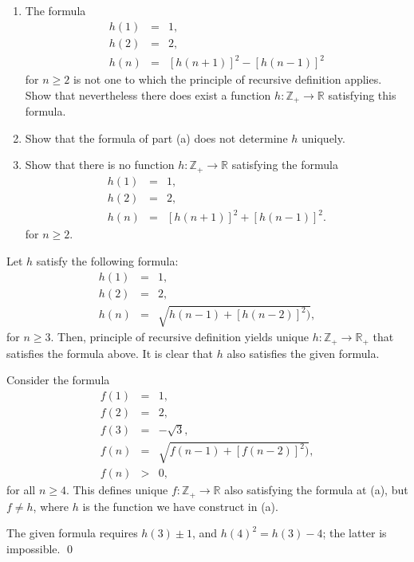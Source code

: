 \documentclass[a4paper,12pt]{article}
\begin{document}
\begin{exe}\leavevmode \par
	\begin{enumerate}
		\item
		      The formula
		      \begin{eqnarray*}
			      h(1)&=&1,\\
			      h(2)&=&2,\\
			      h(n)&=&\left[ h(n+1) \right]^2 - \left[ h(n-1) \right]^2
		      \end{eqnarray*}
		      for \( n\ge 2 \)
		      is not one to which the principle of recursive definition applies.
		      Show that nevertheless there does exist a function
		      \( h:\mathbb{Z}_{+}\to \mathbb{R}\)
		      satisfying this formula.
		      
		\item
		      Show that the formula of part (a) does not determine \( h \)
		      uniquely.
		      
		\item
		      Show that there is no function \( h:\mathbb{Z}_{+} \to \mathbb{R} \)
		      satisfying the formula
		      \begin{eqnarray*}
			      h(1)&=&1,\\
			      h(2)&=&2,\\
			      h(n)&=&\left[ h(n+1) \right]^2 + \left[ h(n-1) \right]^2.
		      \end{eqnarray*}
		      for \( n\ge 2 \).
	\end{enumerate}
\end{exe}\begin{sol}\leavevmode \par
	Let \( h \) satisfy the following formula:
	\begin{eqnarray*}
		h(1)&=&1,\\
		h(2)&=&2,\\
		h(n)&=&\sqrt{h(n-1)+\left[ h(n-2) \right]^2)},
	\end{eqnarray*}
	for \( n \ge 3 \).
	Then, principle of recursive definition yields unique
	\( h: \mathbb{Z}_{+} \to \mathbb{R}_{+}\)
	that satisfies the formula above.
	It is clear that \( h \) also satisfies the given formula.
	
	Consider the formula
	\begin{eqnarray*}
		f(1)&=&1,\\
		f(2)&=&2,\\
		f(3)&=&-\sqrt{3},\\
		f(n)&=&\sqrt{f(n-1)+\left[ f(n-2) \right]^2)},\\
		f(n)&>&0,
	\end{eqnarray*}
	for all \( n \ge 4 \).
	This defines unique \( f:\mathbb{Z}_{+} \to \mathbb{R} \)
	also satisfying the formula at (a),
	but \( f \neq h \),
	where \( h \) is the function we have construct in (a).
	
	The given formula requires
	\( h(3) \pm 1\),
	and
	\( h(4)^2=h(3)-4 \);
	the latter is impossible.
	\qed\end{sol}
\end{document}
